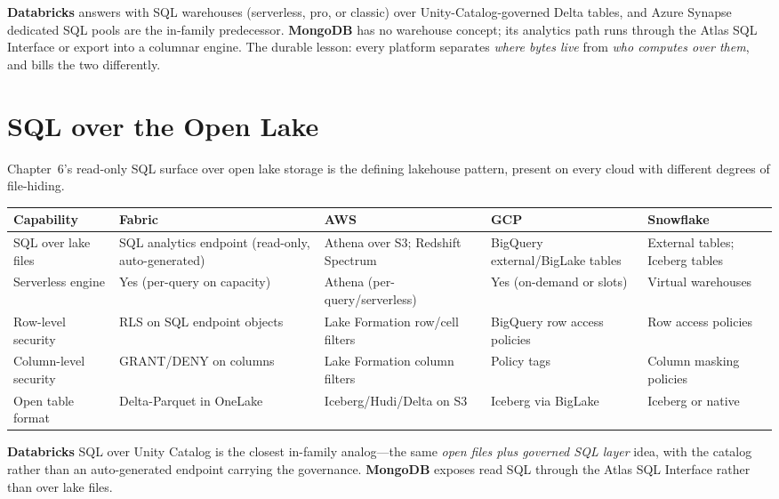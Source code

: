 \noindent \textbf{Databricks} answers with SQL warehouses (serverless, pro, or classic) over
Unity-Catalog-governed Delta tables, and Azure Synapse dedicated SQL pools are the in-family
predecessor. \textbf{MongoDB} has no warehouse concept; its analytics path runs through the
Atlas SQL Interface or export into a columnar engine. The durable lesson: every platform
separates \emph{where bytes live} from \emph{who computes over them}, and bills the two
differently.

\section{SQL over the Open Lake}
%
Chapter~6's read-only SQL surface over open lake storage is the defining lakehouse pattern,
present on every cloud with different degrees of file-hiding.

\begin{center}
\footnotesize
\begin{tabular}{@{}p{2.8cm}p{3.2cm}p{3.2cm}p{3.2cm}p{3.2cm}@{}}
\toprule
\textbf{Capability} & \textbf{Fabric} & \textbf{AWS} & \textbf{GCP} & \textbf{Snowflake} \\
\midrule
SQL over lake files & SQL analytics endpoint (read-only, auto-generated) & Athena over S3; Redshift Spectrum & BigQuery external/BigLake tables & External tables; Iceberg tables \\
Serverless engine & Yes (per-query on capacity) & Athena (per-query/serverless) & Yes (on-demand or slots) & Virtual warehouses \\
Row-level security & RLS on SQL endpoint objects & Lake Formation row/cell filters & BigQuery row access policies & Row access policies \\
Column-level security & GRANT/DENY on columns & Lake Formation column filters & Policy tags & Column masking policies \\
Open table format & Delta-Parquet in OneLake & Iceberg/Hudi/Delta on S3 & Iceberg via BigLake & Iceberg or native \\
\bottomrule
\end{tabular}
\end{center}

\noindent \textbf{Databricks} SQL over Unity Catalog is the closest in-family analog---the same
\emph{open files plus governed SQL layer} idea, with the catalog rather than an auto-generated
endpoint carrying the governance. \textbf{MongoDB} exposes read SQL through the Atlas SQL
Interface rather than over lake files.

